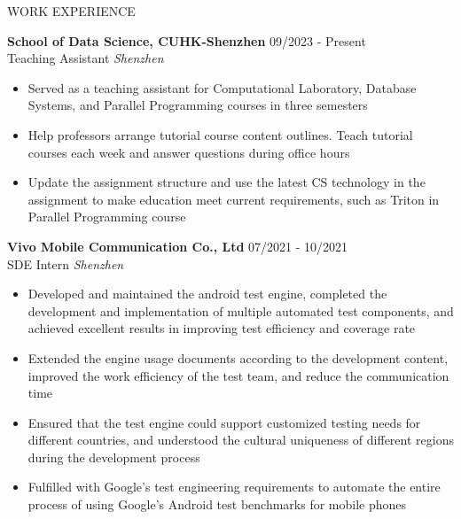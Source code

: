 \documentclass{resume} %
\begin{document}
\begin{rSection}{WORK EXPERIENCE}

\setlength{\parskip}{1.5pt}

\textbf{School of Data Science, CUHK-Shenzhen} \hfill 09/2023 - Present\\
Teaching Assistant \hfill \textit{Shenzhen}
\begin{itemize}
    \setlength{\itemsep}{0pt}
    \setlength{\parsep}{0pt}
    \setlength{\parskip}{0pt}
    \item Served as a teaching assistant for Computational Laboratory, Database Systems, and Parallel Programming courses in three semesters
    \item Help professors arrange tutorial course content outlines. Teach tutorial courses each week and answer questions during office hours
    \item Update the assignment structure and use the latest CS technology in the assignment to make education meet current requirements, such as Triton in Parallel Programming course
\end{itemize}

\textbf{Vivo Mobile Communication Co., Ltd} \hfill 07/2021 - 10/2021\\
SDE Intern \hfill \textit{Shenzhen}
\begin{itemize}
    \setlength{\itemsep}{0pt}
    \setlength{\parsep}{0pt}
    \setlength{\parskip}{0pt}
    \item Developed and maintained the android test engine, completed the development and implementation of multiple automated test components, and achieved excellent results in improving test efficiency and coverage rate
    \item Extended the engine usage documents according to the development content, improved the work efficiency of the test team, and reduce the communication time
    \item Ensured that the test engine could support customized testing needs for different countries, and understood the cultural uniqueness of different regions during the development process
    \item Fulfilled with Google's test engineering requirements to automate the entire process of using Google's Android test benchmarks for mobile phones
\end{itemize}

\end{rSection} 

\end{document}
